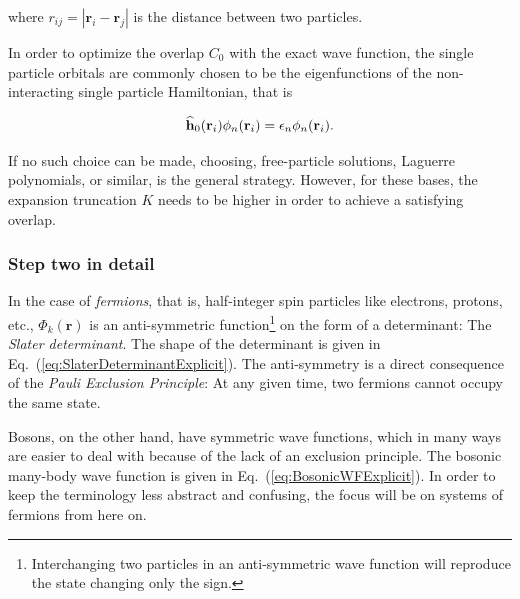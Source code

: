 where $r_{ij} = |\mathbf{r}_i - \mathbf{r}_j|$ is the distance between two particles.

In order to optimize the overlap $C_0$ with the exact wave function, the single particle orbitals are commonly chosen to be the eigenfunctions of the non-interacting single particle Hamiltonian, that is

\begin{equation}
\label{eq:orbitalEigenEq}
 {\bf\widehat{h}}_0(\mathbf{r}_i)\phi_n(\mathbf{r}_i) = \epsilon_n\phi_n(\mathbf{r}_i).
\end{equation}

If no such choice can be made, choosing, free-particle solutions, Laguerre polynomials, or similar, is the general strategy. However, for these bases, the expansion truncation $K$ needs to be higher in order to achieve a satisfying overlap.  


\subsubsection{Step two in detail}

In the case of \textit{fermions}, that is, half-integer spin particles like electrons, protons, etc., $\Phi_k(\mathbf{r})$ is an anti-symmetric function\footnote{Interchanging two particles in an anti-symmetric wave function will reproduce the state changing only the sign.} on the form of a determinant: The \textit{Slater determinant}. The shape of the determinant is given in Eq.~(\ref{eq:SlaterDeterminantExplicit}). The anti-symmetry is a direct consequence of the \textit{Pauli Exclusion Principle}: At any given time, two fermions cannot occupy the same state. 

Bosons, on the other hand, have symmetric wave functions, which in many ways are easier to deal with because of the lack of an exclusion principle. The bosonic many-body wave function is given in Eq.~(\ref{eq:BosonicWFExplicit}). In order to keep the terminology less abstract and confusing, the focus will be on systems of fermions from here on.

